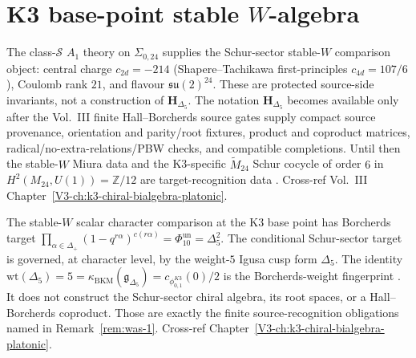 \section{K3 base-point stable $W$-algebra}
\label{sec:was-supplement}

\begin{remark}
\label{rem:was-1}
The class-$\mathcal S$ $A_1$ theory on $\Sigma_{0,24}$ supplies the
Schur-sector stable-$W$ comparison object: central charge
$c_{2d} = -214$ (Shapere--Tachikawa first-principles
$c_{4d} = 107/6$), Coulomb rank $21$, and flavour
$\mathfrak{su}(2)^{24}$. These are protected source-side invariants,
not a construction of $\mathbf H_{\Delta_5}$. The notation
$\mathbf H_{\Delta_5}$ becomes available only after the Vol.~III finite
Hall--Borcherds source gates supply compact source provenance,
orientation and parity/root fixtures, product and coproduct matrices,
radical/no-extra-relations/PBW checks, and compatible completions. Until
then the stable-$W$ Miura data and the K3-specific
$\widetilde M_{24}$ Schur cocycle of order $6$ in
$H^2(M_{24}, U(1)) = \mathbb Z/12$ are target-recognition data
\cite{Gaiotto2009,BeemRastelli2015,ChengDuncanHarvey2014}. Cross-ref
Vol.~III Chapter~\ref{V3-ch:k3-chiral-bialgebra-platonic}.
\end{remark}

\begin{remark}
\label{rem:was-2}
The stable-$W$ scalar character comparison at the K3 base point has
Borcherds target
$\prod_{\alpha\in\Delta_+}(1-q^{r\alpha})^{c(r\alpha)}
=\Phi_{10}^{\mathrm{un}}=\Delta_5^2$.
The conditional Schur-sector target is governed, at character level, by
the weight-$5$ Igusa cusp form $\Delta_5$. The identity
$\mathrm{wt}(\Delta_5)=5=\kappa_{\mathrm{BKM}}(\mathfrak g_{\Delta_5})
=c_{\phi_{0,1}^{K3}}(0)/2$ is the Borcherds-weight fingerprint
\cite{Borcherds1992,Gritsenko1999}. It does not construct the
Schur-sector chiral algebra, its root spaces, or a Hall--Borcherds
coproduct. Those are exactly the finite source-recognition obligations
named in Remark~\ref{rem:was-1}. Cross-ref
Chapter~\ref{V3-ch:k3-chiral-bialgebra-platonic}.
\end{remark}

